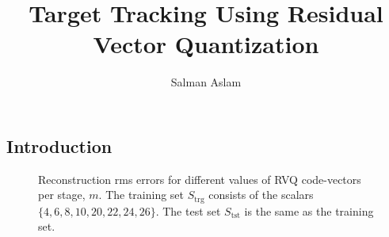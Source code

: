\documentclass[12pt,letterpaper,doublespaced,ETD]{gt-ece-thesis} %
\title{Target Tracking Using Residual Vector Quantization}
\author{Salman Aslam}
\begin{document}
\begin{FrontMatter}
\contents %
\end{FrontMatter}





\begin{Body}	
\chapter{Introduction}


								\begin{figure}
								\centering
								\subfloat{}
								\caption{Reconstruction rms errors for different values of RVQ code-vectors per stage, $m$.  The training set $S_{\textrm{trg}}$ consists of the scalars $\{4, 6, 8, 10, 20, 22, 24, 26\}$.  The test set $S_{\textrm{tst}}$ is the same as the training set.}
								\label{fig:aRVQ_4_6_8_10_20_22_24_26}
								\end{figure}




\end{Body}

\begin{EndMatter}
\end{EndMatter}
\end{document}
